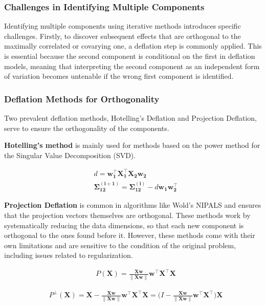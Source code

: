 \subsubsection{Challenges in Identifying Multiple Components}

Identifying multiple components using iterative methods introduces specific challenges.
Firstly, to discover subsequent effects that are orthogonal to the maximally correlated or covarying one, a deflation step is commonly applied.
This is essential because the second component is conditional on the first in deflation models, meaning that interpreting the second component as an independent form of variation becomes untenable if the wrong first component is identified.

\subsubsection{Deflation Methods for Orthogonality}

Two prevalent deflation methods, Hotelling's Deflation and Projection Deflation, serve to ensure the orthogonality of the components.

\textbf{Hotelling's method}  is mainly used for methods based on the power method for the Singular Value
Decomposition (SVD).

\begin{align}
     & d = \mathbf{w^{\top}_1X^{\top}_1X_2w_2}                                            \\
     & \mathbf{\Sigma^{(i+1)}_{12}}= \mathbf{\Sigma^{(i)}_{12}} - d\mathbf{w_1w^{\top}_2}
\end{align}

\textbf{Projection Deflation} is common in algorithms like Wold's NIPALS and ensures that the projection vectors
themselves are orthogonal. These methods work by systematically reducing the data dimensions, so that each new component is orthogonal to the ones found before it. However, these methods come with their own limitations and are sensitive to the condition of the original problem, including issues related to regularization.

\begin{align}
     & P(\mathbf{X})= \frac{\mathbf{Xw}}{\|\mathbf{Xw}\|}\mathbf{w^{\top}X^{\top}X}
\end{align}

\begin{align}
     & P^\perp(\mathbf{X})= \mathbf{X} - \frac{\mathbf{Xw}}{\|\mathbf{Xw}\|}\mathbf{w^{\top}X^{\top}X} = (I - \frac{\mathbf{Xw}}{\|\mathbf{Xw}\|}\mathbf{w^{\top}X^{\top})X}
\end{align}

